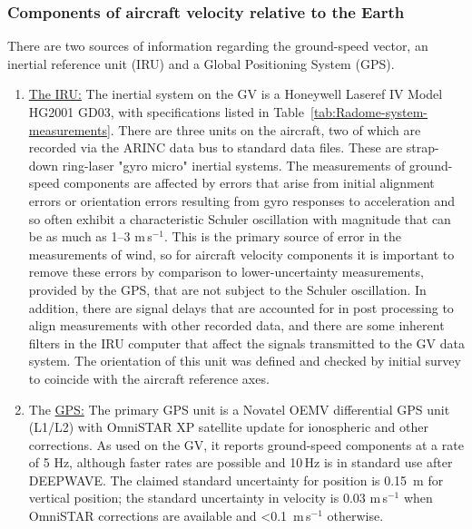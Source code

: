 \documentclass[12pt,twoside,english]{article}\usepackage[]{graphicx}\usepackage[]{color}
\let\OrgIndex\index
\renewcommand*{\index}[1]{\OrgIndex{#1}}
\begin{document}
\subsubsection{Components of aircraft velocity relative to the Earth}

There are two sources of information regarding the ground-speed vector, an inertial reference unit (IRU) and a Global Positioning System (GPS).  
\begin{enumerate}
\item \uline{The IRU:} The inertial system on the GV is a Honeywell Laseref IV Model HG2001 GD03, with specifications listed in Table~\ref{tab:Radome-system-measurements}.  There are three units on the aircraft, two of which are recorded via the ARINC data bus to standard data files. These are strap-down ring-laser "gyro micro" inertial systems. The measurements of ground-speed components are affected by errors that arise from initial alignment errors or orientation errors resulting from gyro responses to acceleration and so often exhibit a characteristic Schuler oscillation with magnitude that can be as much as 1--3 m\,s$^{-1}$. This is the primary source of error in the measurements of wind, so for aircraft velocity components it is important to remove these errors by comparison to lower-uncertainty measurements, provided by the GPS, that are not subject to the Schuler oscillation. In addition, there are signal delays that are accounted for in post processing to align measurements with other recorded data, and there are some inherent filters in the IRU computer that affect the signals transmitted to the GV data system. The orientation of this unit was defined and checked by initial survey to coincide with the aircraft reference axes.  
\item The \uline{GPS:} The primary GPS
unit is a Novatel OEMV differential GPS unit (L1/L2) with OmniSTAR XP satellite update for ionospheric and other corrections. As used on the GV, it reports ground-speed components at a rate of 5 Hz, although faster rates are possible and 10\,Hz is in standard use after DEEPWAVE. The claimed standard uncertainty for position is 0.15~m for vertical position; the standard uncertainty in velocity is 0.03 m\,s$^{-1}$ when OmniSTAR corrections are available and <0.1~m\,s$^{-1}$ otherwise.  
\end{enumerate}
\end{document}
